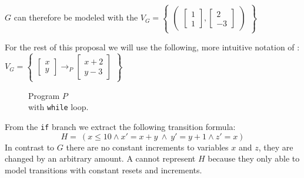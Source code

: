 $G$ can therefore be modeled with the \qvasr  
$V_G = 
\begin{Bmatrix}
	\begin{pmatrix}
		\begin{bmatrix}
			 1 \\
			 1
		\end{bmatrix},
		\begin{bmatrix}
			2 \\
			-3
		\end{bmatrix}
	\end{pmatrix}
\end{Bmatrix}
$ \par \vspace{2pt}
For the rest of this proposal we will use the following, more intuitive notation of \qvasr:
$V_G = 
\begin{Bmatrix}
	\begin{bmatrix}
		x \\
		y
	\end{bmatrix} \rightarrow_P
	\begin{bmatrix}
		x + 2 \\
		y - 3
	\end{bmatrix}
\end{Bmatrix}
$ \par
\begin{minipage}[t]{0.3\textwidth} \centering
	\begin{figure}[H]
		
		\caption{Program $P$ \\ with \texttt{while} loop.}
		\label{code}
	\end{figure}
\end{minipage}

\vspace*{1cm}
From the \texttt{if} branch we extract the following transition formula:
\begin{equation*}
	H= \ (x \leq 10 \land x' = x + y\ \land\ y' = y + 1 \land z' = x)
\end{equation*} In contrast to $G$ there are no constant increments to variables $x$ and $z$, they are changed by an arbitrary amount. A \qvasr cannot represent $H$ because they only able to model transitions with constant resets and increments. 

\newcommand{\s}{\ensuremath{\begin{bmatrix} s_x & s_y & s_z \end{bmatrix}}}
\newcommand{\p}{\ensuremath{\begin{bmatrix} x' \\ y' \\ z' \end{bmatrix}}}
\newcommand{\up}{\ensuremath{\begin{bmatrix} x \\ y \\ z \end{bmatrix}}}

